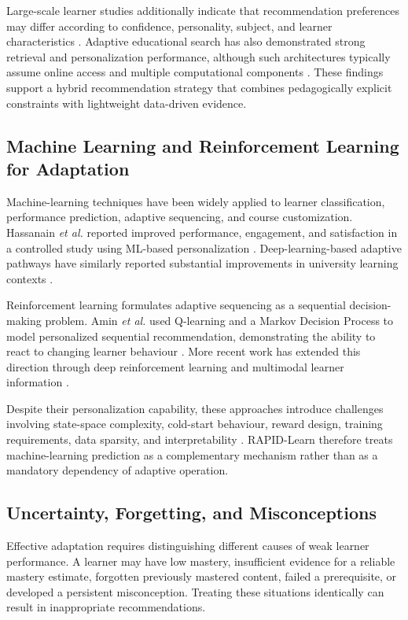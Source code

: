 \documentclass[conference]{IEEEtran}
\begin{document}
Large-scale learner studies additionally indicate that recommendation
preferences may differ according to confidence, personality, subject,
and learner characteristics \cite{dai2024}. Adaptive educational search
has also demonstrated strong retrieval and personalization performance,
although such architectures typically assume online access and multiple
computational components \cite{li2025}. These findings support a hybrid
recommendation strategy that combines pedagogically explicit constraints
with lightweight data-driven evidence.

\subsection{Machine Learning and Reinforcement Learning for Adaptation}

Machine-learning techniques have been widely applied to learner
classification, performance prediction, adaptive sequencing, and course
customization. Hassanain \textit{et al.} reported improved performance,
engagement, and satisfaction in a controlled study using ML-based
personalization \cite{hassanain2025}. Deep-learning-based adaptive
pathways have similarly reported substantial improvements in university
learning contexts \cite{naseer2024}.

Reinforcement learning formulates adaptive sequencing as a sequential
decision-making problem. Amin \textit{et al.} used Q-learning and a
Markov Decision Process to model personalized sequential recommendation,
demonstrating the ability to react to changing learner behaviour
\cite{amin2023}. More recent work has extended this direction through
deep reinforcement learning and multimodal learner information
\cite{ruan2025}.

Despite their personalization capability, these approaches introduce
challenges involving state-space complexity, cold-start behaviour,
reward design, training requirements, data sparsity, and
interpretability \cite{amin2023,ruan2025}. RAPID-Learn therefore treats
machine-learning prediction as a complementary mechanism rather than as
a mandatory dependency of adaptive operation.

\subsection{Uncertainty, Forgetting, and Misconceptions}

Effective adaptation requires distinguishing different causes of weak
learner performance. A learner may have low mastery, insufficient
evidence for a reliable mastery estimate, forgotten previously mastered
content, failed a prerequisite, or developed a persistent
misconception. Treating these situations identically can result in
inappropriate recommendations.
\end{document}
